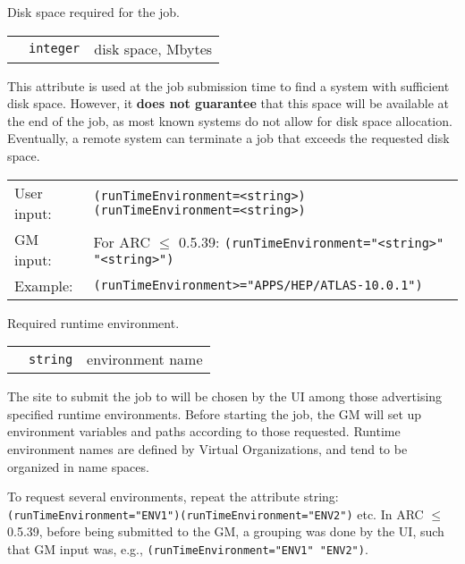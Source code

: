   Disk space required for the job.

  \begin{tabular}{llp{10cm}}
    \hspace*{1cm}&\texttt{integer}  & disk space, Mbytes\\
  \end{tabular}

  \begin{framed}
    This attribute is used at the job submission time to find a system
    with sufficient disk space. However, it \textbf{does not
    guarantee} that this space will be available at the end of the
    job, as most known systems do not allow for disk space
    allocation. Eventually, a remote system can terminate a job that
    exceeds the requested disk space.
  \end{framed}

  \hspace*{0.5cm}
  \begin{shaded}
  \end{shaded}
  \begin{tabular}{lp{13cm}}
    User input:&\verb#(runTimeEnvironment=<string>)(runTimeEnvironment=<string>)#\\
    GM input:&For ARC $\leq$ 0.5.39: \verb#(runTimeEnvironment="<string>" "<string>")#\\
    Example:&\verb#(runTimeEnvironment>="APPS/HEP/ATLAS-10.0.1")#\\
  \end{tabular}

  Required runtime environment.

  \begin{tabular}{llp{10cm}}
    \hspace*{1cm}&\texttt{string} & environment name\\
  \end{tabular}

  The site to submit the job to will be chosen by the UI among those
  advertising specified runtime environments. Before starting the job,
  the GM will set up environment variables and paths according to
  those requested. Runtime environment names are defined by Virtual 
  Organizations, and tend to be organized in name spaces.

  To request several environments, repeat the attribute string:\\
  \verb#(runTimeEnvironment="ENV1")(runTimeEnvironment="ENV2")# etc.   
  In ARC $\leq$ 0.5.39, before being submitted to the GM, a grouping was done by the UI, such that GM input was,
  e.g., \verb#(runTimeEnvironment="ENV1" "ENV2")#.

